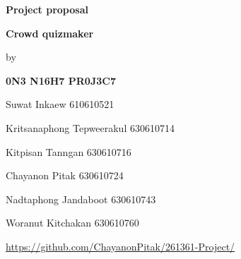 \documentclass[a4paper, 12pt]{report}
\begin{document}
    \begin{titlepage}
        \begin{center}
            {\huge\textbf{Project proposal}}

            \vspace{0.25cm}
            {\large\textbf{Crowd quizmaker}}

            \vspace{1cm}
            by
                
            \vspace{0.25cm}
            \textbf{0N3 N16H7 PR0J3C7}

            \vspace{0.25cm}
            Suwat Inkaew 610610521

            Kritsanaphong Tepweerakul 630610714

            Kitpisan Tanngan 630610716

            Chayanon Pitak 630610724

            Nadtaphong Jandaboot 630610743

            Woranut Kitchakan 630610760

            \vspace{1cm}

            \href{https://github.com/ChayanonPitak/261361-Project/}{https://github.com/ChayanonPitak/261361-Project/}
        \end{center}
    \end{titlepage}

    \tableofcontents

    \pagebreak
\end{document}
